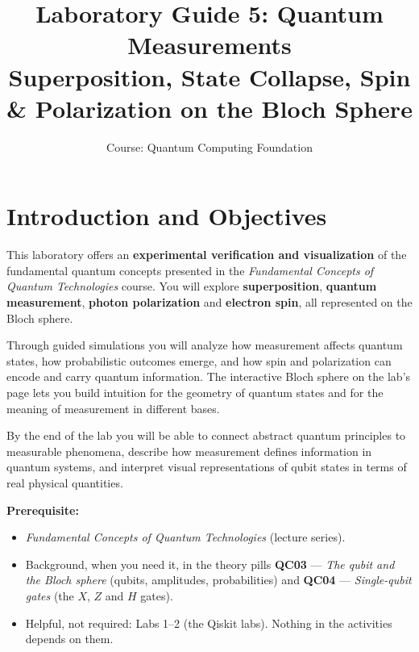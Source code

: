 \documentclass[a4paper,11pt]{article}
\title{\textbf{Laboratory Guide 5: Quantum Measurements}\\
\large Superposition, State Collapse, Spin \& Polarization on the Bloch Sphere}
\author{Course: Quantum Computing Foundation}
\date{}
\begin{document}
\maketitle

\section{Introduction and Objectives}

This laboratory offers an \textbf{experimental verification and visualization} of the
fundamental quantum concepts presented in the \textit{Fundamental Concepts of Quantum
Technologies} course. You will explore \textbf{superposition}, \textbf{quantum
measurement}, \textbf{photon polarization} and \textbf{electron spin}, all represented on
the Bloch sphere.

Through guided simulations you will analyze how measurement affects quantum states, how
probabilistic outcomes emerge, and how spin and polarization can encode and carry quantum
information. The interactive Bloch sphere on the lab's page lets you build intuition for
the geometry of quantum states and for the meaning of measurement in different bases.

By the end of the lab you will be able to connect abstract quantum principles to
measurable phenomena, describe how measurement defines information in quantum systems,
and interpret visual representations of qubit states in terms of real physical
quantities.

\vspace{0.3cm}
\noindent\textbf{Prerequisite:}
\begin{itemize}
    \item \textit{Fundamental Concepts of Quantum Technologies} (lecture series).
    \item Background, when you need it, in the theory pills \textbf{QC03} ---
          \textit{The qubit and the Bloch sphere} (qubits, amplitudes, probabilities) and
          \textbf{QC04} --- \textit{Single-qubit gates} (the $X$, $Z$ and $H$ gates).
    \item Helpful, not required: Labs 1--2 (the Qiskit labs). Nothing in the activities
          depends on them.
\end{itemize}
\end{document}
